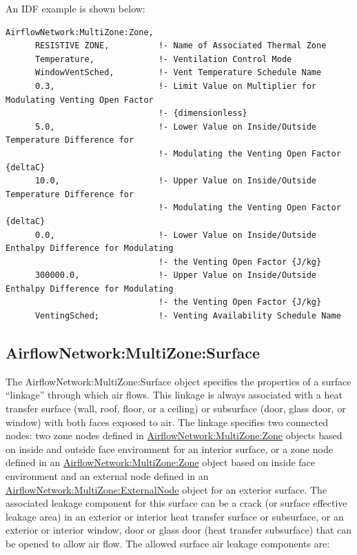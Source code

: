 An IDF example is shown below:

\begin{lstlisting}
AirflowNetwork:MultiZone:Zone,
      RESISTIVE ZONE,          !- Name of Associated Thermal Zone
      Temperature,             !- Ventilation Control Mode
      WindowVentSched,         !- Vent Temperature Schedule Name
      0.3,                     !- Limit Value on Multiplier for Modulating Venting Open Factor
                               !- {dimensionless}
      5.0,                     !- Lower Value on Inside/Outside Temperature Difference for
                               !- Modulating the Venting Open Factor {deltaC}
      10.0,                    !- Upper Value on Inside/Outside Temperature Difference for
                               !- Modulating the Venting Open Factor {deltaC}
      0.0,                     !- Lower Value on Inside/Outside Enthalpy Difference for Modulating
                               !- the Venting Open Factor {J/kg}
      300000.0,                !- Upper Value on Inside/Outside Enthalpy Difference for Modulating
                               !- the Venting Open Factor {J/kg}
      VentingSched;            !- Venting Availability Schedule Name
\end{lstlisting}

\subsection{AirflowNetwork:MultiZone:Surface}\label{airflownetworkmultizonesurface}

The AirflowNetwork:MultiZone:Surface object specifies the properties of a surface ``linkage'' through which air flows. This linkage is always associated with a heat transfer surface (wall, roof, floor, or a ceiling) or subsurface (door, glass door, or window) with both faces exposed to air. The linkage specifies two connected nodes: two zone nodes defined in \hyperref[airflownetworkmultizonezone]{AirflowNetwork:MultiZone:Zone} objects based on inside and outside face environment for an interior surface, or a zone node defined in an \hyperref[airflownetworkmultizonezone]{AirflowNetwork:MultiZone:Zone} object based on inside face environment and an external node defined in an \hyperref[airflownetworkmultizoneexternalnode]{AirflowNetwork:MultiZone:ExternalNode} object for an exterior surface. The associated leakage component for this surface can be a crack (or surface effective leakage area) in an exterior or interior heat transfer surface or subsurface, or an exterior or interior window, door or glass door (heat transfer subsurface) that can be opened to allow air flow. The allowed surface air leakage components are:

